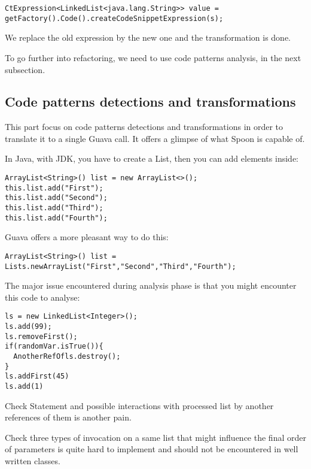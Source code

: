 \documentclass[paper=a4, fontsize=11pt]{scrartcl}
\numberwithin{equation}{section}%
\numberwithin{figure}{section}%
\numberwithin{table}{section}%
\begin{document}
\begin{verbatim}
CtExpression<LinkedList<java.lang.String>> value =
getFactory().Code().createCodeSnippetExpression(s);
\end{verbatim}

We replace the old expression by the new one and the transformation is
done.\newline

To go further into refactoring, we need to use code patterns analysis,
in the next subsection.

\subsection{Code patterns detections and transformations}

This part focus on code patterns detections and transformations in
order to translate it to a single Guava call. It offers a glimpse of
what Spoon is capable of.\newline

In Java, with JDK, you have to create a List, then you can add
elements inside:
\begin{verbatim}
ArrayList<String>() list = new ArrayList<>();
this.list.add("First");
this.list.add("Second");
this.list.add("Third");
this.list.add("Fourth");
\end{verbatim}

Guava offers a more pleasant way to do this:
\begin{verbatim}
ArrayList<String>() list =
Lists.newArrayList("First","Second","Third","Fourth");
\end{verbatim}
\newpage
The major issue encountered during analysis phase is that you might
encounter this code to analyse:

\begin{verbatim}
ls = new LinkedList<Integer>();
ls.add(99);
ls.removeFirst();
if(randomVar.isTrue()){
  AnotherRefOfls.destroy();
}
ls.addFirst(45)
ls.add(1)
\end{verbatim}


Check Statement and possible interactions with processed list by
another references of them is another pain.\newline

Check three types of invocation on a same list that might influence
the final order of parameters is quite hard to implement and should
not be encountered in well written classes. \newline
\end{document}
